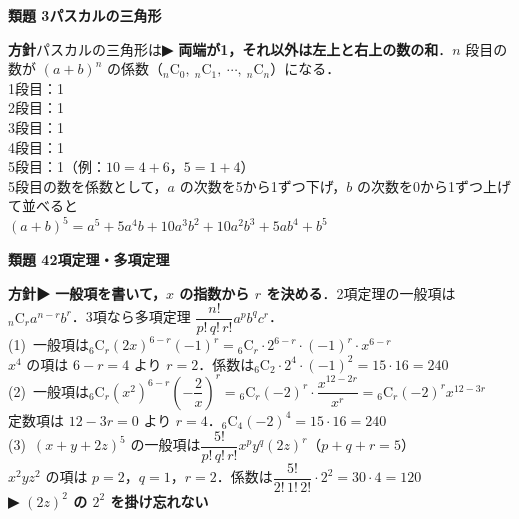 \documentclass[a4paper,11pt]{ltjsarticle}
\newcommand{\ans}[2]{\Needspace{5\baselineskip}\vspace{6pt}%
  {\sffamily\bfseries 類題 #1\quad #2}\par}
\newcommand{\point}[1]{\textsf{\bfseries ▶ #1}}
\begin{document}
\ans{3}{パスカルの三角形}
\begin{kai}
\textbf{方針}\quad パスカルの三角形は\point{両端が1，それ以外は左上と右上の数の和}．$n$ 段目の数が $(a+b)^n$ の係数（${}_n\mathrm C_0,\ {}_n\mathrm C_1,\ \cdots,\ {}_n\mathrm C_n$）になる．\\[2pt]
\hspace*{1.5em}1段目：1\\
\hspace*{1.5em}2段目：1\\
\hspace*{1.5em}3段目：1\\
\hspace*{1.5em}4段目：1\\
\hspace*{1.5em}5段目：1\quad （例：$10=4+6$，$5=1+4$）\\[2pt]
5段目の数を係数として，$a$ の次数を5から1ずつ下げ，$b$ の次数を0から1ずつ上げて並べると\\
\hspace*{1.5em}$(a+b)^5=a^5+5a^4b+10a^3b^2+10a^2b^3+5ab^4+b^5$
\end{kai}

\ans{4}{2項定理・多項定理}
\begin{kai}
\textbf{方針}\quad \point{一般項を書いて，$x$ の指数から $r$ を決める}．2項定理の一般項は ${}_n\mathrm C_ra^{n-r}b^r$．3項なら多項定理 $\dfrac{n!}{p!\,q!\,r!}a^pb^qc^r$．\\[2pt]
(1)\ 一般項は\quad ${}_6\mathrm C_r(2x)^{6-r}(-1)^r={}_6\mathrm C_r\cdot2^{6-r}\cdot(-1)^r\cdot x^{6-r}$\\
\hspace*{1.5em}$x^4$ の項は $6-r=4$ より $r=2$．係数は\quad ${}_6\mathrm C_2\cdot2^4\cdot(-1)^2=15\cdot16=240$\\[2pt]
(2)\ 一般項は\quad ${}_6\mathrm C_r(x^2)^{6-r}\left(-\dfrac2x\right)^r={}_6\mathrm C_r(-2)^r\cdot\dfrac{x^{12-2r}}{x^r}={}_6\mathrm C_r(-2)^rx^{12-3r}$\\
\hspace*{1.5em}定数項は $12-3r=0$ より $r=4$．\quad ${}_6\mathrm C_4(-2)^4=15\cdot16=240$\\[2pt]
(3)\ $(x+y+2z)^5$ の一般項は\quad $\dfrac{5!}{p!\,q!\,r!}x^py^q(2z)^r$\quad （$p+q+r=5$）\\
\hspace*{1.5em}$x^2yz^2$ の項は $p=2$，$q=1$，$r=2$．係数は\quad $\dfrac{5!}{2!\,1!\,2!}\cdot2^2=30\cdot4=120$\\
\hspace*{1.5em}\point{$(2z)^2$ の $2^2$ を掛け忘れない}
\end{kai}
\end{document}
